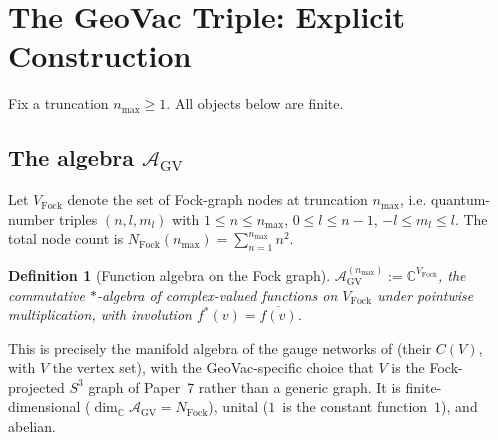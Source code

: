 \documentclass[11pt]{article}
\newtheorem{definition}{Definition}
\begin{document}
\section{The GeoVac Triple: Explicit Construction}
\label{sec:construction}

Fix a truncation $n_{\max} \ge 1$.  All objects below are finite.

\subsection{The algebra $\mathcal{A}_{\mathrm{GV}}$}

Let $V_{\mathrm{Fock}}$ denote the set of Fock-graph nodes at
truncation $n_{\max}$, i.e. quantum-number triples $(n, l, m_l)$ with
$1 \le n \le n_{\max}$, $0 \le l \le n-1$, $-l \le m_l \le l$.  The
total node count is $N_{\mathrm{Fock}}(n_{\max}) = \sum_{n=1}^{n_{\max}}
n^2$.

\begin{definition}[Function algebra on the Fock graph]
\label{def:A_GV}
$\mathcal{A}_{\mathrm{GV}}^{(n_{\max})} := \mathbb{C}^{V_{\mathrm{Fock}}}$,
the commutative $*$-algebra of complex-valued functions on
$V_{\mathrm{Fock}}$ under pointwise multiplication, with involution
$f^* (v) = \overline{f(v)}$.
\end{definition}

This is precisely the manifold algebra of the gauge networks of
\cite{marcolli_vs2014} (their $C(V)$, with $V$ the vertex set), with
the GeoVac-specific choice that $V$ is the Fock-projected $S^3$ graph
of Paper~7 rather than a generic graph.  It is finite-dimensional
($\dim_{\mathbb{C}} \mathcal{A}_{\mathrm{GV}} = N_{\mathrm{Fock}}$),
unital ($1$~is the constant function~$1$), and abelian.
\end{document}
